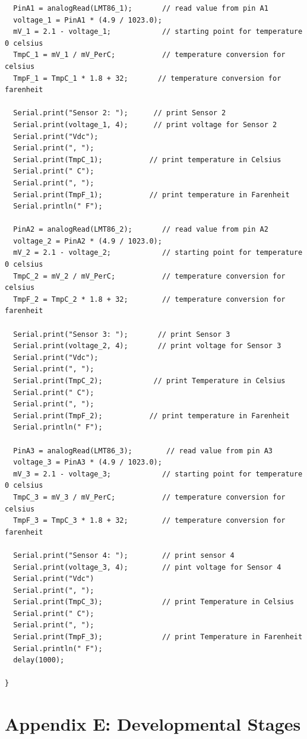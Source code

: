 \documentclass[12pt,a4paper]{report}
\begin{document}
\begin{lstlisting}
  PinA1 = analogRead(LMT86_1);       // read value from pin A1
  voltage_1 = PinA1 * (4.9 / 1023.0);
  mV_1 = 2.1 - voltage_1;            // starting point for temperature 0 celsius 
  TmpC_1 = mV_1 / mV_PerC;           // temperature conversion for celsius
  TmpF_1 = TmpC_1 * 1.8 + 32;       // temperature conversion for farenheit 

  Serial.print("Sensor 2: ");      // print Sensor 2
  Serial.print(voltage_1, 4);      // print voltage for Sensor 2
  Serial.print("Vdc");
  Serial.print(", ");
  Serial.print(TmpC_1);           // print temperature in Celsius 
  Serial.print(" C");
  Serial.print(", ");
  Serial.print(TmpF_1);           // print temperature in Farenheit 
  Serial.println(" F");

  PinA2 = analogRead(LMT86_2);       // read value from pin A2
  voltage_2 = PinA2 * (4.9 / 1023.0); 
  mV_2 = 2.1 - voltage_2;            // starting point for temperature 0 celsius
  TmpC_2 = mV_2 / mV_PerC;           // temperature conversion for celsius
  TmpF_2 = TmpC_2 * 1.8 + 32;        // temperature conversion for farenheit

  Serial.print("Sensor 3: ");       // print Sensor 3
  Serial.print(voltage_2, 4);       // print voltage for Sensor 3
  Serial.print("Vdc");
  Serial.print(", ");
  Serial.print(TmpC_2);            // print Temperature in Celsius
  Serial.print(" C");
  Serial.print(", ");
  Serial.print(TmpF_2);           // print temperature in Farenheit
  Serial.println(" F");

  PinA3 = analogRead(LMT86_3);        // read value from pin A3
  voltage_3 = PinA3 * (4.9 / 1023.0);
  mV_3 = 2.1 - voltage_3;            // starting point for temperature 0 celsius
  TmpC_3 = mV_3 / mV_PerC;           // temperature conversion for celsius
  TmpF_3 = TmpC_3 * 1.8 + 32;        // temperature conversion for farenheit

  Serial.print("Sensor 4: ");        // print sensor 4 
  Serial.print(voltage_3, 4);        // pint voltage for Sensor 4
  Serial.print("Vdc")
  Serial.print(", ");
  Serial.print(TmpC_3);              // print Temperature in Celsius 
  Serial.print(" C");
  Serial.print(", ");
  Serial.print(TmpF_3);              // print Temperature in Farenheit
  Serial.println(" F");
  delay(1000);

}
\end{lstlisting}  

\section{Appendix E: Developmental Stages}
\end{document}

